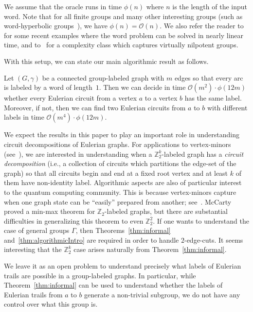 \documentclass[a4paper, 12pt]{article}
\begin{document}
We assume that the oracle runs in time $\phi(n)$ where $n$ is the length of the input word. Note that for all finite groups and many other interesting groups (such as word-hyperbolic groups~\cite{complexityOfDehns, hyperbolicGroupsConjugacy}), we have $\phi(n) = \mathcal{O}(n)$. We also refer the reader to~\cite{mappingClassGroup, 3ManifoldGroups} for some recent examples where the word problem can be solved in nearly linear time, and to~\cite{GrowthOfGroups} for a complexity class which captures virtually nilpotent groups.

With this setup, we can state our main algorithmic result as follows.

\begin{theorem}
\label{thm:algorithmicIntro}
    Let $(G, \gamma)$ be a connected group-labeled graph with $m$ edges so that every arc is labeled by a word of length~$1$. Then we can decide in time $\mathcal{O}(m^2)\cdot \phi(12m)$ whether every Eulerian circuit from a vertex $a$ to a vertex $b$ has the same label. Moreover, if not, then we can find two Eulerian circuits from $a$ to $b$ with different labels in time $\mathcal{O}(m^4)\cdot \phi(12m)$.
\end{theorem}

We expect the results in this paper to play an important role in understanding circuit decompositions of Eulerian graphs. For applications to vertex-minors (see~\cite{McCartyThesis, McCartyEulerian}), we are interested in understanding when a $\mathbb{Z}_2^k$-labeled graph has a \emph{circuit decomposition} (i.e., a collection of circuits which partitions the edge-set of the graph) so that all circuits begin and end at a fixed root vertex and at least $k$ of them have non-identity label. Algorithmic aspects are also of particular interest to the quantum computing community. This is because vertex-minors capture when one graph state can be ``easily'' prepared from another; see~\cite{transformingStates, LCEquiv}. McCarty~\cite{McCartyThesis} proved a min-max theorem for $\mathbb{Z}_2$-labeled graphs, but there are substantial difficulties in generalizing this theorem to even $\mathbb{Z}_2^2$. If one wants to understand the case of general groups $\Gamma$, then Theorems~\ref{thm:informal} and~\ref{thm:algorithmicIntro} are required in order to handle $2$-edge-cuts. It seems interesting that the $\mathbb{Z}_2^k$ case arises naturally from Theorem~\ref{thm:informal}.

We leave it as an open problem to understand precisely what labels of Eulerian trails are possible in a group-labeled graphs. In particular, while Theorem~\ref{thm:informal} can be used to understand whether the labels of Eulerian trails from $a$ to $b$ generate a non-trivial subgroup, we do not have any control over what this group is.
\end{document}
